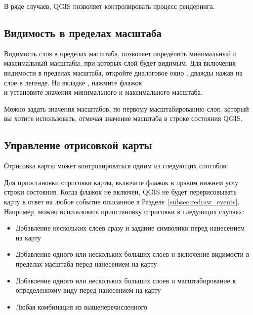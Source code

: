 В ряде случаев, QGIS позволяет контролировать процесс рендеринга.

\subsection{Видимость в пределах масштаба}
\label{label_scaledepend}

Видимость слоя в пределах масштаба, позволяет определить минимальный и
максимальный масштабы, при которых слой будет видимым. Для включения
видимости в пределах масштаба, откройте диалоговое окно ,
дважды нажав на слое в легенде. На вкладке , нажмите флажок \\
 и установите значения минимального
и максимального масштаба.

Можно задать значения масштабов, по первому масштабированию слоя, который
вы хотите использовать, отмечая значение масштаба в строке состояния QGIS.

\subsection{Управление отрисовкой карты}\label{label_controlmap}

Отрисовка карты может контролироваться одним из следующих способов:

\label{label_suspendrender}

Для приостановки отрисовки карты, включите флажок 
в правом нижнем углу строки состояния. Когда флажок 
не включен, QGIS не будет перерисовывать карту в ответ на любое событие
описанное в Разделе~\ref{subsec:redraw_events}. Например, можно
использовать приостановку отрисовки в следующих случаях:

\begin{itemize}
\item Добавление нескольких слоев сразу и задание символики перед
нанесением на карту
\item Добавление одного или нескольких больших слоев и включение видимости
в пределах масштаба перед нанесением на карту
\item Добавление одного или нескольких больших слоев и масштабирование
к определенному виду перед нанесением на карту
\item Любая комбинация из вышеперечисленного
\end{itemize}

